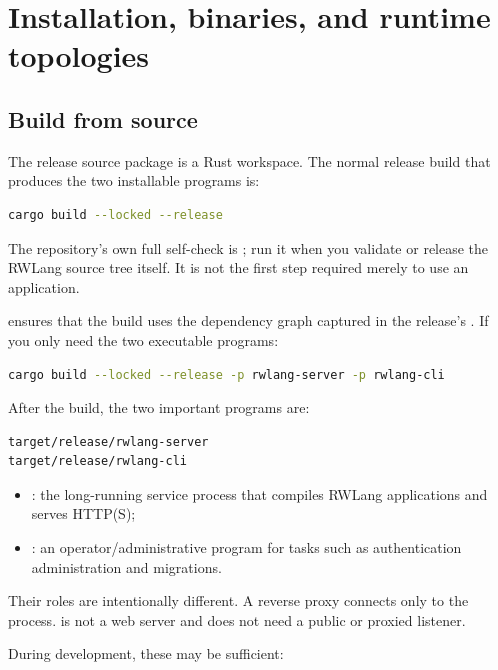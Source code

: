 \chapter{Installation, binaries, and runtime topologies}\label{ch:installation}

\section{Build from source}

The release source package is a Rust workspace. The normal release build that produces the two installable programs is:

\begin{lstlisting}[language=bash]
cargo build --locked --release
\end{lstlisting}

The repository's own full self-check is ; run it when you validate or release the RWLang source tree itself. It is not the first step required merely to use an application.

 ensures that the build uses the dependency graph captured in the release's . If you only need the two executable programs:

\begin{lstlisting}[language=bash]
cargo build --locked --release -p rwlang-server -p rwlang-cli
\end{lstlisting}

After the build, the two important programs are:

\begin{lstlisting}
target/release/rwlang-server
target/release/rwlang-cli
\end{lstlisting}

\begin{itemize}
  \item {}: the long-running service process that compiles RWLang applications and serves HTTP(S);
  \item {}: an operator/administrative program for tasks such as authentication administration and migrations.
\end{itemize}

Their roles are intentionally different. A reverse proxy connects only to the  process.  is not a web server and does not need a public or proxied listener.

During development, these may be sufficient:

